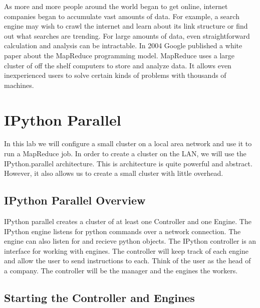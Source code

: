 


As more and more people around the world began to get online, internet companies began to accumulate vast amounts of data.
For example, a search engine may wish to crawl the internet and learn about its link structure or find out what searches are trending.
For large amounts of data, even straightforward calculation and analysis can be intractable.
In 2004 Google published a white paper about the MapReduce programming model.
MapReduce uses a large cluster of off the shelf computers to store and analyze data.
It allows even inexperienced users to solve certain kinds of problems with thousands of machines.


\section{IPython Parallel}

In this lab we will configure a small cluster on a local area network and use it to run a MapReduce job.
In order to create a cluster on the LAN, we will use the IPython.parallel architecture.
This is architecture is quite powerful and abstract.
However, it also allows us to create a small cluster with little overhead.

\subsection{IPython Parallel Overview}

IPython parallel creates a cluster of at least one Controller and one Engine.
The IPython engine listens for python commands over a network connection.
The engine can also listen for and recieve python objects.
The IPython controller is an interface for working with engines.
The controller will keep track of each engine and allow the user to send instructions to each.
Think of the user as the head of a company.
The controller will be the manager and the engines the workers.

\subsection{Starting the Controller and Engines}

